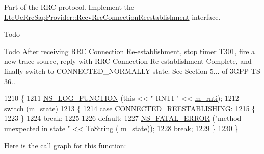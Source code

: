 Part of the R\+RC protocol. Implement the \hyperlink{classns3_1_1LteUeRrcSapProvider_ad9a7cb57c2dda4aade5d2a6a1f36c414}{Lte\+Ue\+Rrc\+Sap\+Provider\+::\+Recv\+Rrc\+Connection\+Reestablishment} interface. 

\begin{DoxyRefDesc}{Todo}
\item[\hyperlink{todo__todo000101}{Todo}]After receiving R\+RC Connection Re-\/establishment, stop timer T301, fire a new trace source, reply with R\+RC Connection Re-\/establishment Complete, and finally switch to C\+O\+N\+N\+E\+C\+T\+E\+D\+\_\+\+N\+O\+R\+M\+A\+L\+LY state. See Section 5... of 3\+G\+PP TS 36.. \end{DoxyRefDesc}

\begin{DoxyCode}
1210 \{
1211   \hyperlink{log-macros-disabled_8h_a90b90d5bad1f39cb1b64923ea94c0761}{NS\_LOG\_FUNCTION} (\textcolor{keyword}{this} << \textcolor{stringliteral}{" RNTI "} << \hyperlink{classns3_1_1LteUeRrc_a8e078d8ef0ad23e670fe2ef08caab84f}{m\_rnti});
1212   \textcolor{keywordflow}{switch} (\hyperlink{classns3_1_1LteUeRrc_a81d711739d758a5add38b100086be632}{m\_state})
1213     \{
1214     \textcolor{keywordflow}{case} \hyperlink{classns3_1_1LteUeRrc_a241012c291e75681150c9214e11f6145a21f43a68d09a00552fc1888be68ce943}{CONNECTED\_REESTABLISHING}:
1215       \{
1223       \}
1224       \textcolor{keywordflow}{break};
1225 
1226     \textcolor{keywordflow}{default}:
1227       \hyperlink{group__fatal_ga5131d5e3f75d7d4cbfd706ac456fdc85}{NS\_FATAL\_ERROR} (\textcolor{stringliteral}{"method unexpected in state "} << \hyperlink{namespacens3_a3d1f7e1bec1972e2ae8d64673fcfcd9c}{ToString} (
      \hyperlink{classns3_1_1LteUeRrc_a81d711739d758a5add38b100086be632}{m\_state}));
1228       \textcolor{keywordflow}{break};
1229     \}
1230 \}
\end{DoxyCode}


Here is the call graph for this function\+:


